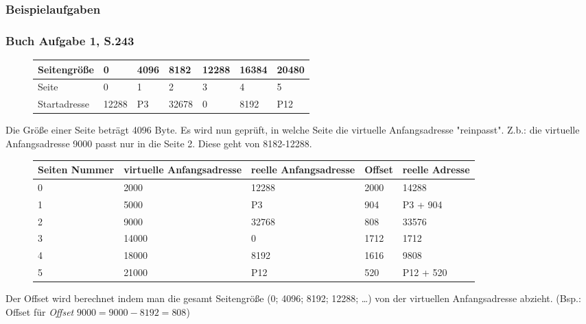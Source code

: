 \documentclass[12pt,a4paper]{article}
\begin{document}
\subsubsection{Beispielaufgaben}

\subsubsection{Buch Aufgabe 1, S.243}
	\begin{figure} [h]
		\begin{tabularx}{17cm}{| l | X | X | X | X | X | X | }
			\hline
			\small{Seitengröße} & 0 & 4096 & 8182 & 12288 & 16384 & 20480 \\
			\hline
			\small{Seite} & 0&1&2&3&4&5\\
			\hline
			\small{Startadresse} & 12288 & P3 & 32678 & 0 & 8192 & P12 \\
			\hline
		\end{tabularx}
	\end{figure}
    \noindent Die Größe einer Seite beträgt 4096 Byte. Es wird nun geprüft, in welche Seite die virtuelle Anfangsadresse "reinpasst". Z.b.: die virtuelle Anfangsadresse 9000 passt nur in die Seite 2. Diese geht von 8182-12288.
    \begin{figure}[h]
        \begin{tabularx}{17cm}{| X | X | X | X | X |}
            \hline 
            \small{Seiten Nummer} & \small{virtuelle Anfangsadresse} & \small{reelle Anfangsadresse} & \small{Offset} & 			\small{reelle Adresse} \\
            \hline
            0 & 2000 & 12288 & 2000 & 14288 \\
            \hline
            1 & 5000 & P3 & 904 & P3 + 904 \\
            \hline
            2 & 9000 & 32768 & 808 & 33576 \\
            \hline
            3 & 14000 & 0 & 1712 & 1712 \\
            \hline
            4 & 18000 & 8192 & 1616 & 9808 \\
            \hline
            5 & 21000 & P12 & 520 & P12 + 520 \\
            \hline
        \end{tabularx}
    \end{figure}
    \noindent Der Offset wird berechnet indem man die gesamt Seitengröße (0; 4096; 8192; 12288; \dots) von der virtuellen Anfangsadresse abzieht. (Bsp.: Offset für \textit{Offset} $9000=9000-8192 = 808$)\newline
\end{document}
